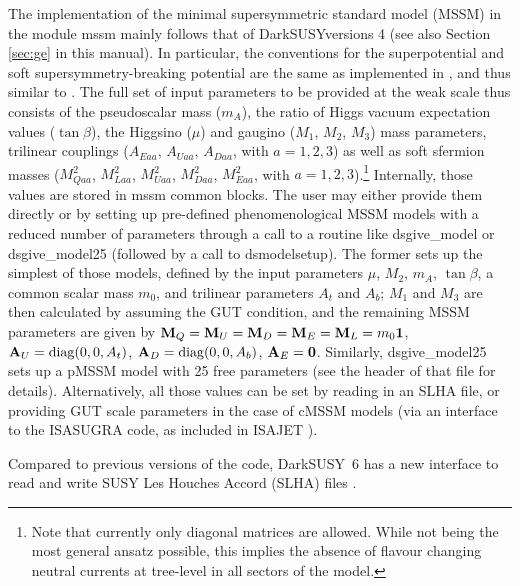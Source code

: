 \documentclass[a4paper,10pt,oneside]{book}
\newcommand{\comment}[1]{}
\newcommand{\code}[1]{\ft{#1}}
\newcommand{\ds}{{\sffamily DarkSUSY}}
\newcommand{\ft}[1]{\textsf{#1}}
\begin{document}
The implementation of the minimal supersymmetric standard model (MSSM)
in the module \code{mssm} mainly follows that of \ds versions 4 \cite{ds4}
(see also Section \ref{sec:ge} in this manual). 
In particular, the conventions 
for the superpotential and soft supersymmetry-breaking potential are the same as 
implemented in \cite{Bergstrom:1995cz}, and thus similar to \cite{Haber:1984rc,Gunion:1984yn}.
The full set of input parameters to be provided at the weak scale thus consists of the 
pseudoscalar mass ($m_A$), 
the ratio of Higgs vacuum expectation values ($\tan\beta$), the Higgsino ($\mu$) and 
gaugino ($M_1$, $M_2$, $M_3$) mass parameters, trilinear couplings ($A_{Eaa}$,
$A_{Uaa}$, $A_{Daa}$, with $a=1,2,3$) as well as  soft sfermion masses ($M^2_{Qaa}$, 
$M^2_{Laa}$, $M^2_{Uaa}$, $M^2_{Daa}$, $M^2_{Eaa}$, with $a=1,2,3$).\footnote{
Note that currently only diagonal matrices are allowed.  While not being the most general
ansatz possible, this implies the absence of flavour changing neutral currents at tree-level  
in all sectors of the model.
}
Internally, those values are stored in \code{mssm} common blocks. The user may either 
provide them directly or by setting up pre-defined phenomenological MSSM models
with a reduced number of parameters
through a call to a routine like \code{dsgive\_model} or  \code{dsgive\_model25}
(followed by a call to \code{dsmodelsetup}). The 
former sets up the simplest of those models, defined by the input parameters  
$\mu$, $M_2$, $m_A$, $\tan\beta$, a common scalar mass $m_0$, and trilinear 
parameters $A_t$ and $A_b$; $M_1$ and $M_3$ are then calculated by assuming the 
GUT condition, and the remaining MSSM parameters are 
 given by ${\bf M}_Q = {\bf M}_U = {\bf M}_D = {\bf M}_E = {\bf M}_L = m_0{\bf 1}$, 
 ${\bf A}_U = {\rm diag}(0,0,A_t)$, ${\bf A}_D = {\rm diag}(0,0,A_b)$, ${\bf A}_E = {\bf 0}$. 
 Similarly, \code{dsgive\_model25} sets up a pMSSM model with 25 free parameters
 (see the header of that file for details). Alternatively, all those values can be set by 
 reading in an SLHA file, or providing GUT scale parameters in the case of cMSSM
 models (via an interface to the \code{ISASUGRA} code, as included in ISAJET \cite{Paige:2003mg,isajet_www}).
 
Compared to previous versions of the code, \ds\ 6 has a new interface to read and write SUSY 
Les Houches Accord (SLHA) files \cite{Skands:2003cj,Allanach:2008qq}. 
\comment{would be good to give some details here, also a warning that not everything is perfect
yet!}
 
\end{document}
